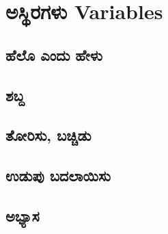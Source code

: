 \chapter{ಅಸ್ಥಿರಗಳು \textenglish{Variables}}

\section{ಹೆಲೊ ಎಂದು ಹೇಳು }

\section{ಶಬ್ದ }
\SampleProgram

\section{ತೋರಿಸು, ಬಚ್ಚಿಡು}

\section{ಉಡುಪು ಬದಲಾಯಿಸು}

\section{ಅಭ್ಯಾಸ }